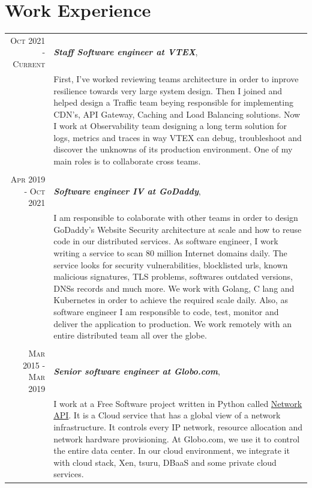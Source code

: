 \documentclass[a4paper,10pt]{article} %
\begin{document}
\section{Work Experience}

\begin{longtable}{r|p{11cm}}

\textsc{Oct 2021 - Current} & \emph{\bf Staff Software engineer at VTEX}, \\
& \footnotesize{
    First, I've worked reviewing teams architecture in order to inprove
    resilience towards very large system design. Then I joined and helped
    design a Traffic team beying responsible for implementing CDN's,
    API Gateway, Caching and Load Balancing solutions. Now I work at
    Observability team designing a long term solution for logs, metrics and
    traces in way VTEX can debug, troubleshoot and discover the unknowns of its
    production environment. One of my main roles is to collaborate cross teams.
  } \\
\multicolumn{2}{c}{} \\

\textsc{Apr 2019 - Oct 2021} & \emph{\bf Software engineer IV at GoDaddy}, \\
& \footnotesize{
    I am responsible to colaborate with other teams in order to design
    GoDaddy's Website Security architecture at scale and how to reuse code
    in our distributed services.
    As software engineer, I work  writing a service to scan
    80 million Internet domains daily. The service looks for security
    vulnerabilities, blocklisted urls, known malicious signatures,
    TLS problems, softwares outdated versions, DNSs records and much more.
    We work with Golang, C lang and Kubernetes in order to achieve the
    required scale daily. Also, as software engineer I am responsible to code,
    test, monitor and deliver the application to production.
    We work remotely with an entire distributed team all over the globe.} \\
\multicolumn{2}{c}{} \\

\textsc{Mar 2015 - Mar 2019} & \emph{\bf Senior software engineer at Globo.com}, \\
& \footnotesize{I work at a Free Software project written in Python called
	\href{https://github.com/globocom/GloboNetworkAPI}{Network API}.
    It is a Cloud service that has a global view of a network infrastructure.
    It controls every IP network, resource allocation and network
    hardware provisioning. At Globo.com, we use it to control the entire
    data center. In our cloud environment, we integrate it with cloud stack,
    Xen, tsuru, DBaaS and some private cloud services.

}
\end{longtable}
\end{document}
